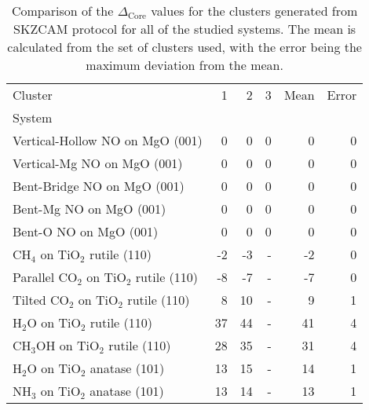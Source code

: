 \begin{table}
\caption{\label{tab:deltacore}Comparison of the $\Delta_\textrm{Core}$ values for the clusters generated from SKZCAM protocol for all of the studied systems. The mean is calculated from the set of clusters used, with the error being the maximum deviation from the mean.}
\begin{adjustbox}{center,max width=1\textwidth}
\begin{tabular}{lrrrrr}
\toprule
Cluster & 1 & 2 & 3 & Mean & Error \\ 
System &  &  &  &  &  \\
\midrule
Vertical-Hollow NO on MgO (001) & 0 & 0 & 0 & 0 & 0 \\
Vertical-Mg NO on MgO (001) & 0 & 0 & 0 & 0 & 0 \\
Bent-Bridge NO on MgO (001) & 0 & 0 & 0 & 0 & 0 \\
Bent-Mg NO on MgO (001) & 0 & 0 & 0 & 0 & 0 \\
Bent-O NO on MgO (001) & 0 & 0 & 0 & 0 & 0 \\
CH$_4$ on TiO$_2$ rutile (110) & -2 & -3 & - & -2 & 0 \\
Parallel CO$_2$ on TiO$_2$ rutile (110) & -8 & -7 & - & -7 & 0 \\
Tilted CO$_2$ on TiO$_2$ rutile (110) & 8 & 10 & - & 9 & 1 \\
H$_2$O on TiO$_2$ rutile (110) & 37 & 44 & - & 41 & 4 \\
CH$_3$OH on TiO$_2$ rutile (110) & 28 & 35 & - & 31 & 4 \\
H$_2$O on TiO$_2$ anatase (101) & 13 & 15 & - & 14 & 1 \\
NH$_3$ on TiO$_2$ anatase (101) & 13 & 14 & - & 13 & 1 \\
\bottomrule
\end{tabular}
\end{adjustbox}
\end{table}